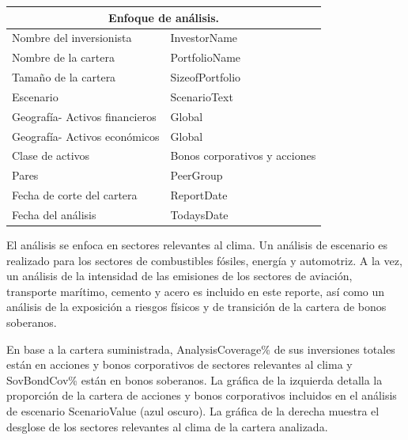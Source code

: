 \documentclass[10pt,table]{article}\usepackage[]{graphicx}\usepackage[]{color}
\begin{document}
\begin{multicols}{2}
		\begin{center}
			{
				\setlength{\tabcolsep}{10pt} %
				\renewcommand{\arraystretch}{1.5} %
				\begin{tabular}{ p{.35\linewidth} p{.49\linewidth} }
					\hline
					\multicolumn{2}{c}{\textbf{Enfoque de análisis.}} \\
					\hline
					Nombre del inversionista & InvestorName \\ 
					Nombre de la cartera & PortfolioName \\ 
					Tamaño de la cartera & SizeofPortfolio \\ 
					Escenario & ScenarioText \\ 
					Geografía- \newline Activos financieros & Global \\ 
					Geografía- \newline Activos económicos & Global \\ 
					Clase de activos & Bonos corporativos y acciones \\ 
					Pares & PeerGroup \\
					Fecha de corte del cartera & ReportDate \\ 
					Fecha del análisis & TodaysDate \\ 
					\hline
				\end{tabular}
			}
			
		\end{center}
		
		El análisis se enfoca en sectores relevantes al clima. Un análisis de escenario es realizado para los sectores de combustibles fósiles, energía y automotriz. A la vez, un análisis de la intensidad de las emisiones de los sectores de aviación, transporte marítimo, cemento y acero es incluido en este reporte, así como un análisis de la exposición a riesgos físicos y de transición de la cartera de bonos soberanos. 
		
		En base a la cartera suministrada, AnalysisCoverage\% de sus inversiones totales están en acciones y bonos corporativos de sectores relevantes al clima y SovBondCov\% están en bonos soberanos. La gráfica de la izquierda detalla la proporción de la cartera de acciones y bonos corporativos incluidos en el análisis de escenario ScenarioValue (azul oscuro). La gráfica de la derecha muestra el desglose de los sectores relevantes al clima de la cartera analizada.
		
		
		
		
		\vspace{0.8cm}
		
		
	\end{multicols}	
	
\end{document}
